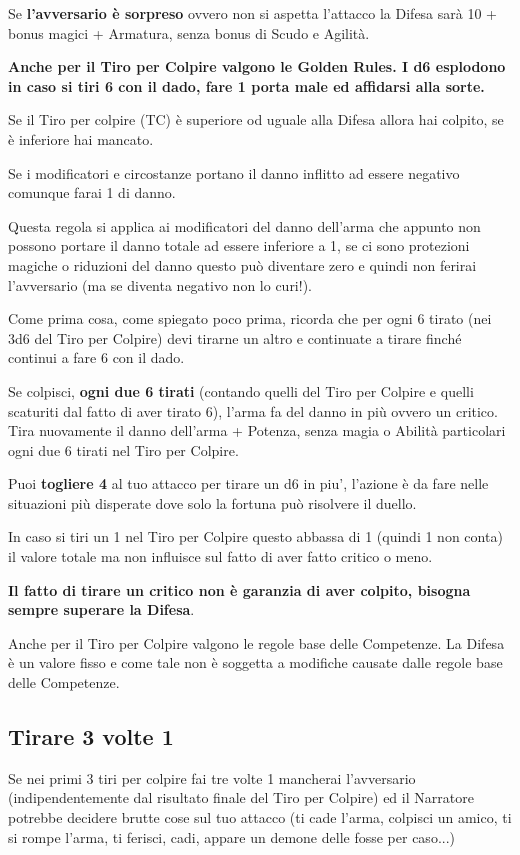 \documentclass[a4paper,11pt,twoside,openany]{book}
\begin{document}
Se \textbf{l'avversario è sorpreso} ovvero non si aspetta l'attacco la Difesa sarà 10 + bonus magici + Armatura, senza bonus di Scudo e Agilità.

\textbf{Anche per il Tiro per Colpire valgono le Golden Rules. I d6 esplodono in caso si tiri 6 con il dado, fare 1 porta male ed affidarsi alla sorte.}

Se il Tiro per colpire (TC) è superiore od uguale alla Difesa allora hai colpito, se è inferiore hai mancato.

Se i modificatori e circostanze portano il danno inflitto ad essere negativo comunque farai 1 di danno.

Questa regola si applica ai modificatori del danno dell'arma che appunto non possono portare il danno totale ad essere inferiore a 1, se ci sono protezioni magiche o riduzioni del danno questo può diventare zero e quindi non ferirai l'avversario (ma se diventa negativo non lo curi!).

Come prima cosa, come spiegato poco prima, ricorda che per ogni 6 tirato (nei 3d6 del Tiro per Colpire) devi tirarne un altro e continuate a tirare finché continui a fare 6 con il dado.

Se colpisci, \textbf{ogni due 6 tirati} (contando quelli del Tiro per Colpire e quelli scaturiti dal fatto di aver tirato 6), l'arma fa del danno in più ovvero un critico. Tira nuovamente il danno dell'arma + Potenza, senza magia o Abilità particolari ogni due 6 tirati nel Tiro per Colpire.

Puoi \textbf{togliere 4} al tuo attacco per tirare un d6 in piu', l'azione è da fare nelle situazioni più disperate dove solo la fortuna può risolvere il duello.

In caso si tiri un 1 nel Tiro per Colpire questo abbassa di 1 (quindi 1 non conta) il valore totale ma non influisce sul fatto di aver fatto critico o meno.

\textbf{Il fatto di tirare un critico non è garanzia di aver colpito,
	bisogna sempre superare la Difesa}.

Anche per il Tiro per Colpire valgono le regole base delle Competenze.
La Difesa è un valore fisso e come tale non è soggetta a modifiche
causate dalle regole base delle Competenze.

\subsection{Tirare 3 volte 1}

Se nei primi 3 tiri per colpire fai tre volte 1 mancherai l'avversario (indipendentemente dal risultato finale del Tiro per Colpire) ed il Narratore potrebbe decidere brutte cose sul tuo attacco (ti cade l'arma, colpisci un amico, ti si rompe l'arma, ti ferisci, cadi, appare un demone delle fosse per caso...)
\end{document}
